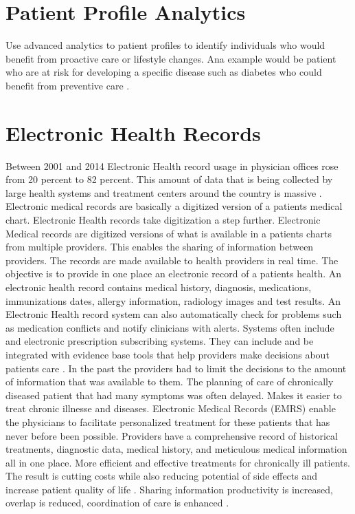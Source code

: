 \documentclass[sigconf]{acmart}
\begin{document}
\section{Patient Profile Analytics}
Use advanced analytics to patient profiles to identify individuals who would benefit from proactive care or lifestyle changes. Ana example would be patient who are at risk for developing a specific disease such as diabetes who could benefit from preventive care \cite{springer}. 
\section{Electronic Health Records}

Between 2001 and 2014 Electronic Health record usage in physician offices rose from 20 percent to 82 percent. This amount of data that is being collected by large health systems and treatment centers around the country is massive \cite{www-google-pred}. 
Electronic medical records are basically a digitized version of a patients medical chart. Electronic Health records take digitization a step further. Electronic Medical records are digitized versions of what is available in a patients charts from multiple providers. This enables the sharing of information between providers.  The records are made available to health providers in real time. The objective is to provide in one place an electronic record of a patients health. An electronic health record contains medical history, diagnosis, medications, immunizations dates, allergy information, radiology images and test results.  An Electronic Health record system can also automatically check for problems such as medication conflicts and notify clinicians with alerts. Systems often include and electronic prescription subscribing systems. They can include and be integrated with evidence base tools that help providers make decisions about patients care \cite{www-google-elec}.  
In the past the providers had to limit the decisions to the amount of information that was available to them. The planning of care of chronically diseased patient that had many symptoms was often delayed. Makes it easier to treat chronic illnesse and diseases. Electronic Medical Records (EMRS) enable the physicians to facilitate personalized treatment for these patients that has never before been possible. Providers have a comprehensive record of historical treatments, diagnostic data, medical history, and meticulous medical information all in one place. More efficient and effective treatments for chronically ill patients. The result is cutting costs while also reducing potential of side effects and increase patient quality of life \cite{www-google-christian}. Sharing information productivity is increased, overlap is reduced, coordination of care is enhanced \cite{www-google-christian}.
\end{document}
